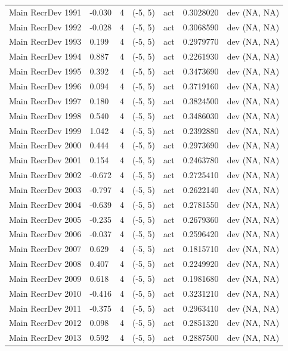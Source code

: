 \documentclass[
  english,
  a4paper,
]{article}
\begin{document}
\begin{landscape}
\begin{longtable}[t]{>{\raggedright\arraybackslash}p{8.5cm}lllll>{\raggedright\arraybackslash}p{4cm}}
Main RecrDev 1991 & -0.030 & 4 & (-5, 5) & act & 0.3028020 & dev (NA, NA)\\
Main RecrDev 1992 & -0.028 & 4 & (-5, 5) & act & 0.3068590 & dev (NA, NA)\\
Main RecrDev 1993 & 0.199 & 4 & (-5, 5) & act & 0.2979770 & dev (NA, NA)\\
Main RecrDev 1994 & 0.887 & 4 & (-5, 5) & act & 0.2261930 & dev (NA, NA)\\
Main RecrDev 1995 & 0.392 & 4 & (-5, 5) & act & 0.3473690 & dev (NA, NA)\\
Main RecrDev 1996 & 0.094 & 4 & (-5, 5) & act & 0.3719160 & dev (NA, NA)\\
Main RecrDev 1997 & 0.180 & 4 & (-5, 5) & act & 0.3824500 & dev (NA, NA)\\
Main RecrDev 1998 & 0.540 & 4 & (-5, 5) & act & 0.3486030 & dev (NA, NA)\\
Main RecrDev 1999 & 1.042 & 4 & (-5, 5) & act & 0.2392880 & dev (NA, NA)\\
Main RecrDev 2000 & 0.444 & 4 & (-5, 5) & act & 0.2973690 & dev (NA, NA)\\
Main RecrDev 2001 & 0.154 & 4 & (-5, 5) & act & 0.2463780 & dev (NA, NA)\\
Main RecrDev 2002 & -0.672 & 4 & (-5, 5) & act & 0.2725410 & dev (NA, NA)\\
Main RecrDev 2003 & -0.797 & 4 & (-5, 5) & act & 0.2622140 & dev (NA, NA)\\
Main RecrDev 2004 & -0.639 & 4 & (-5, 5) & act & 0.2781550 & dev (NA, NA)\\
Main RecrDev 2005 & -0.235 & 4 & (-5, 5) & act & 0.2679360 & dev (NA, NA)\\
Main RecrDev 2006 & -0.037 & 4 & (-5, 5) & act & 0.2596420 & dev (NA, NA)\\
Main RecrDev 2007 & 0.629 & 4 & (-5, 5) & act & 0.1815710 & dev (NA, NA)\\
Main RecrDev 2008 & 0.407 & 4 & (-5, 5) & act & 0.2249920 & dev (NA, NA)\\
Main RecrDev 2009 & 0.618 & 4 & (-5, 5) & act & 0.1981680 & dev (NA, NA)\\
Main RecrDev 2010 & -0.416 & 4 & (-5, 5) & act & 0.3231210 & dev (NA, NA)\\
Main RecrDev 2011 & -0.375 & 4 & (-5, 5) & act & 0.2963410 & dev (NA, NA)\\
Main RecrDev 2012 & 0.098 & 4 & (-5, 5) & act & 0.2851320 & dev (NA, NA)\\
Main RecrDev 2013 & 0.592 & 4 & (-5, 5) & act & 0.2887500 & dev (NA, NA)\\

\end{longtable}
\end{landscape}
\end{document}
